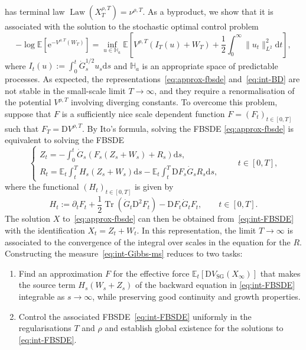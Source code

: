 \documentclass[11pt, a4paper]{scrartcl}
\numberwithin{equation}{section}
\theoremstyle{plain}
\theoremstyle{remark}
\newcommand{\assign}{:=}
\newcommand{\mathD}{\mathrm{D}}
\newcommand{\mathd}{\mathrm{d}}
\newcommand{\mathe}{\mathrm{e}}
\newcommand{\tmop}[1]{\ensuremath{\operatorname{#1}}}
\newcommand{\tmtextit}[1]{\text{{\itshape{#1}}}}
\begin{document}
has terminal law $\tmop{Law} (X_T^{\rho, T}) = \nu^{\rho, T}$. As a byproduct, we show
that it is associated with the solution to the stochastic optimal control
problem
\begin{equation}
	- \log \mathbb{E} [\mathe^{- V^{\rho, T} (W_T)}] = \inf_{u \in \mathbb{H}_a}
	\mathbb{E} \left[ V^{\rho, T} (I_T (u) + W_T) + \frac{1}{2} \int_0^{\infty}
		\| u_t \|^2_{L^2} \mathd t \right] \label{eq:int-BD},
\end{equation}
where $I_t (u) \assign \int_0^t \dot{G}^{1 / 2}_s u_s \mathd s$ and
$\mathbb{H}_a$ is an appropriate space of predictable processes. As expected,
the representations~\eqref{eq:approx-fbsde} and~\eqref{eq:int-BD} are not
stable in the small-scale limit $T \rightarrow \infty$, and they require a
renormalisation of the potential $V^{\rho, T}$ involving diverging constants.
To overcome this problem, suppose that $F$ is a sufficiently nice scale
dependent function $F = (F_t)_{t \in [0, T]}$ such that $F_T = \mathD V^{\rho,
			T}$. By Ito's formula, solving the FBSDE \eqref{eq:approx-fbsde} is equivalent
to solving the FBSDE
\begin{equation}
	\begin{cases}
		Z_t = - \int_0^t \dot{G}_s (F_s (Z_s + W_s) + R_s) \mathd s, \\
		R_t =\mathbb{E}_t \int_t^T H_s (Z_s + W_s) \mathd s -\mathbb{E}_t \int_t^T
		\mathD F_s  \dot{G}_s R_s \mathd s,
	\end{cases}  \label{eq:int-FBSDE} \qquad t \in [0, T],
\end{equation}
where the functional $(H_t)_{t \in [0, T]}$ is given by
\[ H_t \assign \partial_t F_t + \frac{1}{2} \tmop{Tr} (\dot{G}_t \mathD^2 F_t)
	- \mathD F_t  \dot{G}_t F_t, \qquad t \in [0, T] . \]
The solution $X$ to~\eqref{eq:approx-fbsde} can then be obtained
from~\eqref{eq:int-FBSDE} with the identification $X_t = Z_t + W_t$. In this
representation, the limit $T \rightarrow \infty$ is associated to the
convergence of the integral over scales in the equation for the
\tmtextit{remainder} $R$. Constructing the measure~\eqref{eq:int-Gibbs-ms}
reduces to two tasks:
\begin{enumerate}
	\item Find an approximation $F$ for the effective force $\mathbb{E}_t
		      [\mathD V_{\tmop{SG}} (X_{\infty})]$ that makes the source term $H_s (W_s +
		      Z_s)$ of the backward equation in \eqref{eq:int-FBSDE} integrable as $s
		      \rightarrow \infty$, while preserving good continuity and growth properties.

	\item Control the associated FBSDE~\eqref{eq:int-FBSDE} uniformly in the
	      regularisations $T$ and $\rho$ and establish global existence for the
	      solutions to \eqref{eq:int-FBSDE}.
\end{enumerate}
\end{document}
